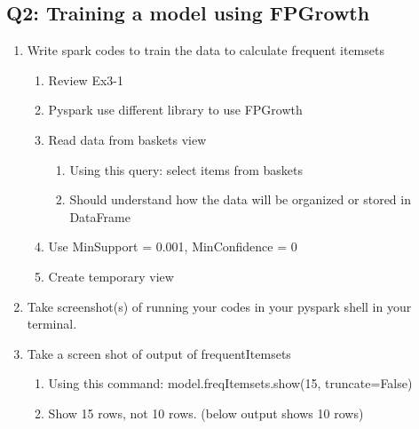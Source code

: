 \documentclass[]{article}
\begin{document}
\subsection*{Q2: Training a model using FPGrowth}
\begin{enumerate}[before=\itshape,label=\arabic*.]
	\item Write spark codes to train the data to calculate frequent itemsets
	\begin{enumerate}[before=\itshape,label=\alph*.]
		\item Review Ex3-1
		\item Pyspark use different library to use FPGrowth
		\item Read data from baskets view
		\begin{enumerate}[before=\itshape,label=\roman*.]
			\item Using this query: select items from baskets
			\item Should understand how the data will be organized or stored in DataFrame
		\end{enumerate}
		\item Use MinSupport = 0.001, MinConfidence = 0
		\item Create temporary view
	\end{enumerate}
	\item Take screenshot(s) of running your codes in your pyspark shell in your terminal.
	\item Take a screen shot of output of frequentItemsets
	\begin{enumerate}[before=\itshape,label=\alph*.]
		\item Using this command: model.freqItemsets.show(15, truncate=False)
		\item Show 15 rows, not 10 rows. (below output shows 10 rows)
	\end{enumerate}
\end{enumerate} 
\end{document}
